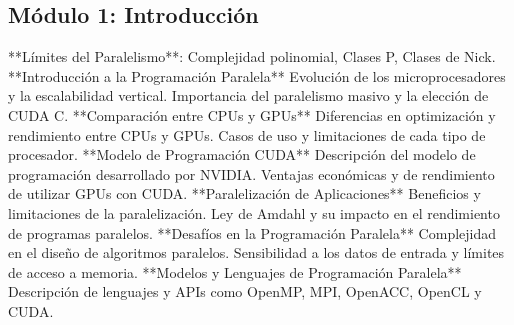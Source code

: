 \subsection{Módulo 1: Introducción}

**Límites del Paralelismo**: Complejidad polinomial, Clases P, Clases de Nick. **Introducción a la Programación
Paralela** Evolución de los microprocesadores y la escalabilidad vertical. Importancia del paralelismo masivo y la
elección de CUDA C. **Comparación entre CPUs y GPUs** Diferencias en optimización y rendimiento entre CPUs y GPUs. Casos
de uso y limitaciones de cada tipo de procesador. **Modelo de Programación CUDA** Descripción del modelo de programación
desarrollado por NVIDIA. Ventajas económicas y de rendimiento de utilizar GPUs con CUDA. **Paralelización de
Aplicaciones** Beneficios y limitaciones de la paralelización. Ley de Amdahl y su impacto en el rendimiento de programas
paralelos. **Desafíos en la Programación Paralela** Complejidad en el diseño de algoritmos paralelos. Sensibilidad a los
datos de entrada y límites de acceso a memoria. **Modelos y Lenguajes de Programación Paralela** Descripción de
lenguajes y APIs como OpenMP, MPI, OpenACC, OpenCL y CUDA.


